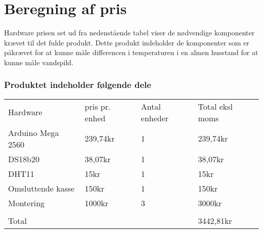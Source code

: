 \section{Beregning af pris}
Hardware prisen set ud fra nedenstående tabel viser de nødvendige komponenter krævet til det fulde produkt. Dette produkt indeholder de komponenter som er påkrævet for at kunne måle differencen i temperaturen i en almen husstand for at kunne måle vandspild.
\subsubsection{Produktet indeholder følgende dele}  



\begin{tabular}{ |p{3cm}||p{3cm}|p{3cm}|p{3cm}|  }
 \hline
 \rowcolor{lightgray}\multicolumn{4}{|c|}{Pris beregning} \\
 \hline
 Hardware    & pris pr. enhed &Antal enheder&Total eksl moms\\
 \hline
 Arduino Mega 2560   & 239,74kr    &1&   239,74kr\\
 \hline
 DS18b20&   38,07kr  & 1   &38,07kr\\
 \hline
 DHT11 &15kr & 1&  15kr\\
 \hline
  Omsluttende kasse\footnotemark  &150kr & 1&  150kr\\
 \hline
  Montering &1000kr & 3&  3000kr\\
 \hline
 		&	&	&\\
 \hline
 Total	&	&	&3442,81kr\\
 \hline 
\end{tabular}
